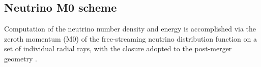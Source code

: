 










\subsection{Neutrino M0 scheme}


Computation of the neutrino number density and energy is 
accomplished via the zeroth momentum (M0) of the free-streaming neutrino distribution 
function on a set of individual radial rays, with the closure adopted to the post-merger geometry \citep{Radice:2016dwd,Radice:2018pdn}.

